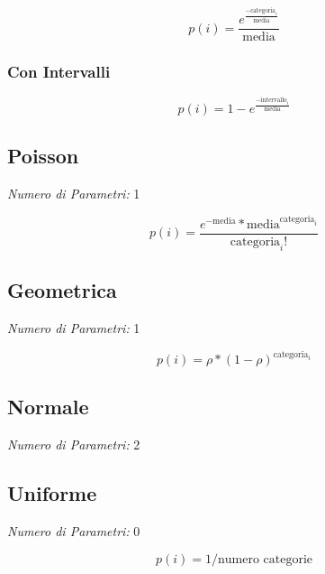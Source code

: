 \[
      p(i) = \frac{e^{\frac{- \text{categoria}_i}{\text{media}}}}{\text{media}}
\]

\subsubsection{Con Intervalli}

\[
      p(i) = 1 - e^{\frac{- \text{intervallo}_i}{\text{media}}}
\]

\subsection{Poisson}

\textit{Numero di Parametri:} 1

\[
      p(i) = \frac{e^{- \text{media}} * \text{media}^{\text{categoria}_i}}{\text{categoria}_i !}
\]

\subsection{Geometrica}

\textit{Numero di Parametri:} 1

\[
      p(i) = \rho * (1 - \rho)^{\text{categoria}_i}
\]

\subsection{Normale}

\textit{Numero di Parametri:} 2

\subsection{Uniforme}

\textit{Numero di Parametri:} 0

\[
      p(i) = 1 / \text{numero categorie}
\]